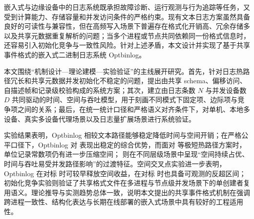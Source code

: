 嵌入式与边缘设备中的日志系统既承担故障诊断、运行观测与行为追踪等任务，又受到计算能力、存储容量和并发访问条件的严格约束。现有文本日志方案虽然具备良好的可读性与兼容性，但在高频写入场景下普遍存在格式化开销高、冗余存储多以及共享元数据重复解析的问题；当多个进程或节点共同依赖同一份格式信息时，还容易引入初始化竞争与一致性风险。针对上述矛盾，本文设计并实现了基于共享事件格式的嵌入式二进制日志系统 Optbinlog。

本文围绕``机制设计---理论建模---实验验证''的主线展开研究。首先，针对日志热路径冗长和共享元数据并发初始化不稳定的问题，提出由共享 schema、偏移访问、自描述帧和记录级校验构成的系统方案；其次，建立由日志条数 \(N\) 与并发设备数 \(D\) 共同驱动的时间、空间与吞吐模型，用于刻画不同模式下固定项、边际项与竞争项之间的关系；最后，在统一统计口径和严格语义对齐条件下，对单机、本地多设备、真实多设备代理场景以及日志量扩展场景进行系统验证。

实验结果表明，Optbinlog 相较文本路径能够稳定降低时间与空间开销；在严格公平口径下，Optbinlog 对  表现出稳定的综合优势，而面对  等极短热路径方案时，单位记录常数项仍有进一步压缩空间； 则在不同层级场景中呈现``空间持续占优、时间与吞吐易受并发路径影响''的过渡特征。空间交叉点实验进一步表明，Optbinlog 在对标  时可较早释放空间收益，在对标  时也具备可观测的反超区间；初始化竞争实验则验证了共享格式文件在多进程与节点级并发场景下的单创建者复用语义。理论推导与实测趋势总体一致，说明本文提出的共享事件格式机制在强调跨进程一致性、结构化表达与长期在线部署的嵌入式场景中具有较好的工程适用性。
